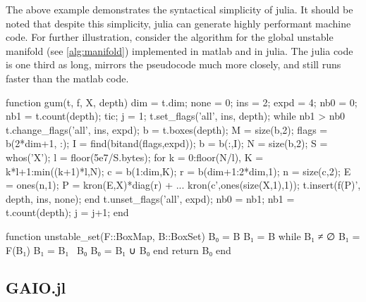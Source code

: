 The above example demonstrates the syntactical simplicity of julia. 
It should be noted that despite this simplicity, julia can generate highly performant 
machine code. For further illustration, consider the algorithm for the global unstable 
manifold (see \autoref{alg:manifold}) implemented in matlab and in julia. The julia 
code is one third as long, mirrors the pseudocode much more closely, 
and still runs faster than the matlab code.

\begin{jllisting}[language=matlab, style=jlcodestyle, label=lst:gum:matlab, caption=Unstable manifold algorithm in matlab]
    function gum(t, f, X, depth)
    dim = t.dim;
    none = 0; ins = 2; expd = 4;             %
    nb0 = 0;  nb1 = t.count(depth);          %
    tic; j = 1;
    t.set_flags('all', ins, depth);
    while nb1 > nb0                          %
    t.change_flags('all', ins, expd);        %
    b = t.boxes(depth); M = size(b,2);       %
    flags = b(2*dim+1, :); 
    I = find(bitand(flags,expd));            %
    b = b(:,I); N = size(b,2);
    S = whos('X'); l = floor(5e7/S.bytes);
    for k = 0:floor(N/l),                    %
        K = k*l+1:min((k+1)*l,N);
        c = b(1:dim,K);                      %
        r = b(dim+1:2*dim,1);                %
        n = size(c,2); E = ones(n,1);
        P = kron(E,X)*diag(r) + ...          %
            kron(c',ones(size(X,1),1));
        t.insert(f(P)', depth, ins, none);   %
    end
    t.unset_flags('all', expd);              %
    nb0 = nb1; nb1 = t.count(depth);
    j = j+1;
    end
\end{jllisting}

\begin{jllisting}[language=julia, style=jlcodestyle, label=lst:gum:julia, caption=Unstable manifold algorithm in julia]
    function unstable_set(F::BoxMap, B::BoxSet)
        B₀ = B
        B₁ = B
        while B₁ ≠ ∅
            B₁ = F(B₁)
            B₁ = B₁ \ B₀
            B₀ = B₁ ∪ B₀
        end
        return B₀
    end
\end{jllisting}


\subsection{GAIO.jl}


